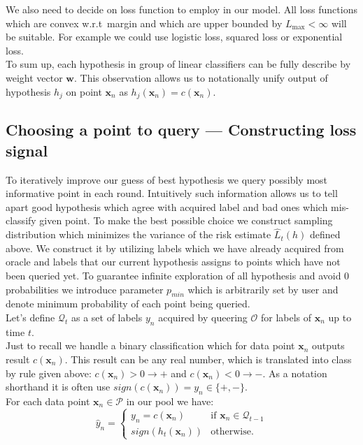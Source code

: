 \documentclass[12pt, a4paper, pdflatex]{report}
\begin{document}
We also need to decide on loss function to employ in our model. All loss functions which are convex w.r.t\ margin and which are upper bounded by $L_{\text{max}} < \infty$ will be suitable. For example we could use logistic loss, squared loss or exponential loss.\\

To sum up, each hypothesis in group of linear classifiers can be fully describe by weight vector $\mathbf{w}$. This observation allows us to notationally unify output of hypothesis $h_j$ on point $\mathbf{x}_n$ as $h_j(\mathbf{x}_n) = c(\mathbf{x}_n)$.\\


\subsection{Choosing a point to query --- Constructing loss signal\label{sec:pointtoquery}}
To iteratively improve our guess of best hypothesis we query possibly most informative point in each round. Intuitively such information allows us to tell apart good hypothesis which agree with acquired label and bad ones which mis-classify given point. To make the best possible choice we construct sampling distribution which minimizes the variance of the risk estimate $\hat{L}_t(h)$ defined above. We construct it by utilizing labels which we have already acquired from oracle and labels that our current hypothesis assigns to points which have not been queried yet. To guarantee infinite exploration of all hypothesis and avoid $0$ probabilities we introduce parameter $p_{min}$ which is arbitrarily set by user and denote minimum probability of each point being queried.\\

Let's define $\mathscr{Q}_t$ as a set of labels $y_n$ acquired by queering $\mathscr{O}$ for labels of $\mathbf{x}_n$ up to time $t$.\\
Just to recall we handle a binary classification which for data point $\mathbf{x}_n$ outputs result $c(\mathbf{x}_n)$. This result can be any real number, which is translated into class by rule given above: $c(\mathbf{x}_n) > 0 \rightarrow +$ and $c(\mathbf{x}_n) < 0 \rightarrow -$. As a notation shorthand it is often use $\textit{sign}(c(\mathbf{x}_n)) = y_n \in \{+, -\}$.\\

For each data point $\mathbf{x}_n \in \mathscr{P}$ in our pool we have:
$$
\hat{y}_n = \begin{cases}
                                    y_n = c(\mathbf{x}_n)  & \text{if } \mathbf{x}_n \in \mathscr{Q}_{t-1} \\
                                    \textit{sign}(h_t(\mathbf{x}_n)) & \text{otherwise.}
                                  \end{cases} 
$$
\end{document}
